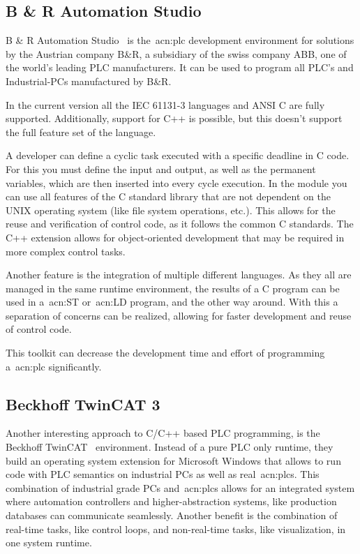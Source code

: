 \subsection{B \& R Automation Studio}
B \& R Automation Studio~\cite{b-r_automation:2020} is the~\acrshort{acn:plc} development environment for solutions by the Austrian company B\&R, a subsidiary of the swiss company ABB, one of the world's leading PLC manufacturers.
It can be used to program all PLC's and Industrial-PCs manufactured by B\&R.

In the current version all the IEC 61131-3 languages and ANSI C are fully supported.
Additionally, support for C++ is possible, but this doesn't support the full feature set of the language.

A developer can define a cyclic task executed with a specific deadline in C code.
For this you must define the input and output, as well as the permanent variables, which are then inserted into every cycle execution.
In the module you can use all features of the C standard library that are not dependent on the UNIX operating system (like file system operations, etc.).
This allows for the reuse and verification of control code, as it follows the common C standards.
The C++ extension allows for object-oriented development that may be required in more complex control tasks.

Another feature is the integration of multiple different languages.
As they all are managed in the same runtime environment, the results of a C program can be used in a~\acrfull{acn:ST} or~\acrfull{acn:LD} program, and the other way around.
With this a separation of concerns can be realized, allowing for faster development and reuse of control code.

This toolkit can decrease the development time and effort of programming a~\acrshort{acn:plc} significantly.

\subsection{Beckhoff TwinCAT 3}

Another interesting approach to C/C++ based PLC programming, is the Beckhoff TwinCAT~\cite{Beckhoff:2020:2} environment.
Instead of a pure PLC only runtime, they build an operating system extension for Microsoft Windows that allows to run code with PLC semantics on industrial PCs as well as real~\acrshort{acn:plc}s.
This combination of industrial grade PCs and~\acrshort{acn:plc}s allows for an integrated system where automation controllers and higher-abstraction systems, like production databases can communicate seamlessly.
Another benefit is the combination of real-time tasks, like control loops, and non-real-time tasks, like visualization, in one system runtime.

